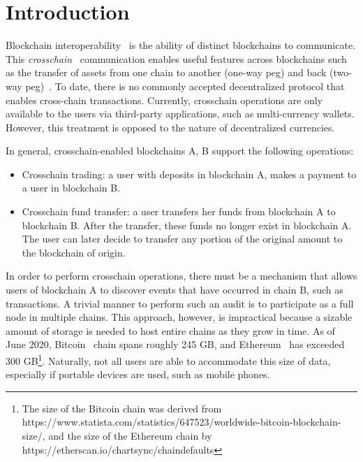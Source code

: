 \section{Introduction}

Blockchain interoperability~\cite{dionyziz} is the ability of distinct
blockchains to communicate.  This \emph{crosschain}~\cite{pow-sidechains,
pos-sidechains,burn,crosschain-sok, gtklocker} communication enables useful
features across blockchains such as the transfer of assets from one chain to
another (one-way peg) and back (two-way peg)~\cite{pow-sidechains}. To date,
there is no commonly accepted decentralized protocol that enables cross-chain
transactions. Currently, crosschain operations are only available to the users
via third-party applications, such as multi-currency wallets. However, this
treatment is opposed to the nature of decentralized currencies.

\noindent

In general, crosschain-enabled blockchains A, B support the following
operations:

\begin{itemize}
\item Crosschain trading: a user with deposits in blockchain A, makes a
    payment to a user in blockchain B.
\item Crosschain fund transfer: a user transfers her funds from blockchain
    A to blockchain B. After the transfer, these funds no longer exist in
    blockchain A. The user can later decide to transfer any portion of the
    original amount to the blockchain of origin.
\end{itemize}


\noindent

In order to perform crosschain operations, there must be a mechanism that
allows users of blockchain A to discover events that have occurred in chain B,
such as transactions. A trivial manner to perform such an audit is to
participate as a full node in multiple chains. This approach, however, is
impractical because a sizable amount of storage is needed to host entire
chains as they grow in time. As of June 2020, Bitcoin~\cite{nakamoto} chain
spans roughly 245 GB, and Ethereum~\cite{wood, buterin} has exceeded 300
GB\footnote{The size of the Bitcoin chain was derived from
    https://www.statista.com/statistics/647523/worldwide-bitcoin-blockchain-size/,
    and the size of the Ethereum chain by
https://etherscan.io/chartsync/chaindefaults}. Naturally, not all users are
able to accommodate this size of data, especially if portable devices are used,
such as mobile phones.

